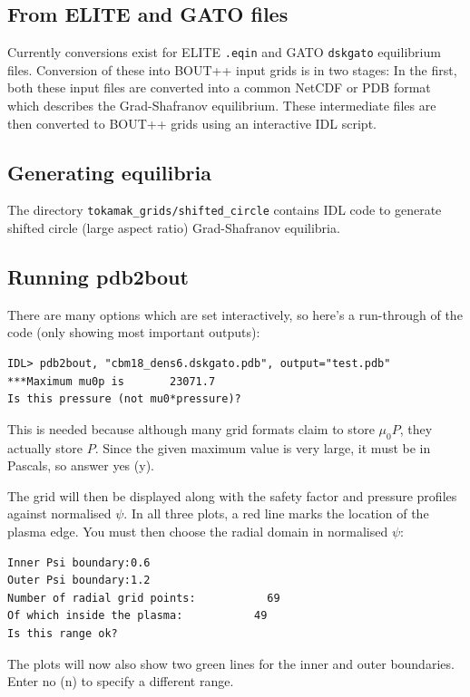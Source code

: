 \documentclass[12pt]{article}
\newcommand{\code}[1]{\texttt{#1}}
\begin{document}
\subsection{From ELITE and GATO files}
Currently conversions exist for ELITE \code{.eqin} and GATO \code{dskgato} equilibrium files.
Conversion of these into BOUT++ input grids is in two stages: In the first, both these
input files are converted into a common NetCDF or PDB format which describes the Grad-Shafranov equilibrium.
These intermediate files are then converted to BOUT++ grids using an interactive IDL script.


\subsection{Generating equilibria}

The directory \texttt{tokamak\_grids/shifted\_circle} contains IDL code to generate shifted circle
(large aspect ratio) Grad-Shafranov equilibria.

\subsection{Running pdb2bout}

There are many options which are set interactively, so here's a run-through of the code (only showing most important outputs):

\begin{verbatim}
IDL> pdb2bout, "cbm18_dens6.dskgato.pdb", output="test.pdb"
***Maximum mu0p is       23071.7
Is this pressure (not mu0*pressure)?
\end{verbatim}
This is needed because although many grid formats claim to store $\mu_0 P$, they actually store $P$. Since the given maximum value is very large, it must be in Pascals, so answer yes (y).

The grid will then be displayed along with the safety factor and pressure
profiles against normalised $\psi$. In all three plots, a red line marks the
location of the plasma edge. You must then choose the radial domain in normalised $\psi$:
\begin{verbatim}
Inner Psi boundary:0.6
Outer Psi boundary:1.2
Number of radial grid points:           69
Of which inside the plasma:           49
Is this range ok?
\end{verbatim}
The plots will now also show two green lines for the inner and outer boundaries. Enter no (n) to specify a different range.
\end{document}
